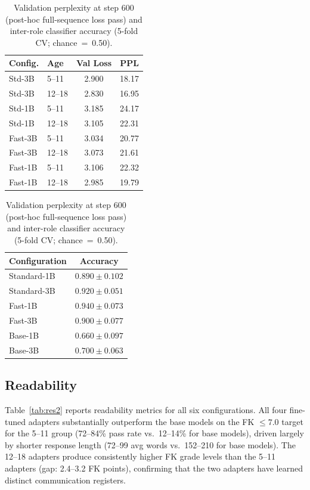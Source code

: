 \documentclass[AMA,Times1COL]{WileyNJDv5} %
\begin{document}
\begin{table}[!t]
  \centering
  \caption{Validation perplexity at step 600 (post-hoc full-sequence loss pass) and inter-role classifier accuracy (5-fold CV; chance~=~0.50).}
  \label{tab:res1}
  \footnotesize
  \begin{minipage}[t]{0.5\linewidth}
    \centering
    \begin{tabular}{llcc}
      \hline
      Config. & Age & Val Loss & PPL \\
      \hline
      Std-3B & 5--11  & 2.900 & 18.17 \\
      Std-3B & 12--18 & 2.830 & 16.95 \\
      Std-1B & 5--11  & 3.185 & 24.17 \\
      Std-1B & 12--18 & 3.105 & 22.31 \\
      Fast-3B & 5--11  & 3.034 & 20.77 \\
      Fast-3B & 12--18 & 3.073 & 21.61 \\
      Fast-1B & 5--11  & 3.106 & 22.32 \\
      Fast-1B & 12--18 & 2.985 & 19.79 \\
      \hline
    \end{tabular}
  \end{minipage}%
  \begin{minipage}[t]{0.5\linewidth}
    \centering
    \begin{tabular}{lc}
      \hline
      Configuration & Accuracy \\
      \hline
      Standard-1B & $0.890 \pm 0.102$ \\
      Standard-3B & $0.920 \pm 0.051$ \\
      Fast-1B     & $0.940 \pm 0.073$ \\
      Fast-3B     & $0.900 \pm 0.077$ \\
      Base-1B     & $0.660 \pm 0.097$ \\
      Base-3B     & $0.700 \pm 0.063$ \\
      \hline
    \end{tabular}
  \end{minipage}
\end{table}

\subsection{Readability}

Table~\ref{tab:res2} reports readability metrics for all six configurations. All four fine-tuned adapters substantially outperform the base models on the FK $\leq 7.0$ target for the 5--11 group (72--84\% pass rate vs.\ 12--14\% for base models), driven largely by shorter response length (72--99 avg words vs.\ 152--210 for base models). The 12--18 adapters produce consistently higher FK grade levels than the 5--11 adapters (gap: 2.4--3.2 FK points), confirming that the two adapters have learned distinct communication registers.
\end{document}
